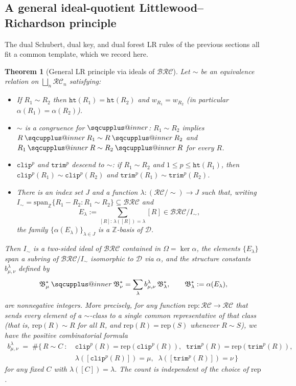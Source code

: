 \documentclass{amsart}
\makeatletter
\newcommand{\sqcupplus@inner}[2]{%
  \vcenter{\hbox{\ooalign{%
    \hfil$\m@th#1\sqcup$\hfil\cr
    \hfil\raisebox{0.15ex}{$\m@th#1\scriptscriptstyle+$}\hfil\cr
  }}}%
}
\newcommand{\sqcupplus}{\mathbin{\mathpalette\sqcupplus@inner\relax}}
\newtheorem{theorem}{Theorem}[section]
\theoremstyle{definition}
\theoremstyle{remark}
\numberwithin{equation}{subsection}
\newcommand{\wof}[1]{w_{#1}}
\newcommand{\trm}{\mathtt{trim}}
\newcommand{\hr}{\mathtt{ht}}
\newcommand{\clp}{\mathtt{clip}}
\newcommand{\BRC}{\mathcal{BRC}}
\newcommand{\RC}{\mathcal{RC}}
\newcommand{\dcoma}{\mathcal{D}}
\makeatother
\begin{document}
\subsection{A general ideal-quotient Littlewood--Richardson principle}

The dual Schubert, dual key, and dual forest LR rules of the previous sections all fit a common template, which we record here.

\begin{theorem}[General LR principle via ideals of $\BRC$]\label{theorem:general_lr_template}
Let $\sim$ be an equivalence relation on $\bigsqcup_n \RC_n$ satisfying:
\begin{itemize}
\item[(H1)] If $R_1\sim R_2$ then $\hr(R_1)=\hr(R_2)$ and $\wof{R_1}=\wof{R_2}$ (in particular $\alpha(R_1)=\alpha(R_2)$).
\item[(H2)] $\sim$ is a congruence for $\sqcupplus$: $R_1\sim R_2$ implies $R\sqcupplus R_1\sim R\sqcupplus R_2$ and $R_1\sqcupplus R\sim R_2\sqcupplus R$ for every $R$.
\item[(H3)] $\clp^p$ and $\trm^p$ descend to $\sim$: if $R_1\sim R_2$ and $1\leq p\leq \hr(R_1)$, then $\clp^p(R_1)\sim \clp^p(R_2)$ and $\trm^p(R_1)\sim \trm^p(R_2)$.
\item[(H4)] There is an index set $J$ and a function $\lambda:(\RC/\!\sim)\to J$ such that, writing $I_\sim=\mathrm{span}_{\mathbb{Z}}\{R_1-R_2:R_1\sim R_2\}\subseteq\BRC$ and
$$E_\lambda := \sum_{[R]:\,\lambda([R])=\lambda} [R] \in \BRC/I_\sim,$$
the family $\{\alpha(E_\lambda)\}_{\lambda\in J}$ is a $\mathbb{Z}$-basis of $\dcoma$.

\end{itemize}
Then $I_\sim$ is a two-sided ideal of $\BRC$ contained in $\Omega=\ker\alpha$, the elements $\{E_\lambda\}$ span a subring of $\BRC/I_\sim$ isomorphic to $\dcoma$ via $\alpha$, and the structure constants $b_{\mu,\nu}^\lambda$ defined by
$$\mathfrak{B}_\mu^*\sqcupplus\mathfrak{B}_\nu^* = \sum_\lambda b_{\mu,\nu}^\lambda\,\mathfrak{B}_\lambda^*,\qquad \mathfrak{B}_\lambda^*:=\alpha(E_\lambda),$$
are nonnegative integers. More precisely, for any function $\mathrm{rep}\colon\RC\to\RC$ that sends every element of a $\sim$-class to a single common representative of that class (that is, $\mathrm{rep}(R)\sim R$ for all $R$, and $\mathrm{rep}(R)=\mathrm{rep}(S)$ whenever $R\sim S$), we have the positive combinatorial formula
\begin{align*}
b_{\mu,\nu}^\lambda \;=\; \#\bigl\{\,R\sim C\ :\ &\clp^p(R)=\mathrm{rep}(\clp^p(R)),\;\;\trm^p(R)=\mathrm{rep}(\trm^p(R)),\\
&\lambda([\clp^p(R)])=\mu,\;\;\lambda([\trm^p(R)])=\nu\,\bigr\}
\end{align*}
for any fixed $C$ with $\lambda([C])=\lambda$. The count is independent of the choice of $\mathrm{rep}$.
\end{theorem}
\end{document}
